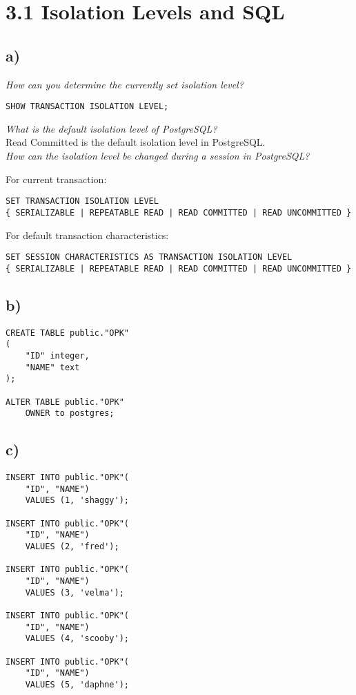 \documentclass[ngerman]{dis-template-add}
\begin{document}
\section*{3.1 Isolation Levels and SQL}

\subsection*{a)}

\textit{How can you determine the currently set isolation level?
}
\begin{verbatim}
SHOW TRANSACTION ISOLATION LEVEL;
\end{verbatim}

\textit{What is the default isolation level of PostgreSQL?
} \\
Read Committed is the default isolation level in PostgreSQL. \\

\textit{How can the isolation level be changed during a session in PostgreSQL?}

For current transaction:
\begin{verbatim}
SET TRANSACTION ISOLATION LEVEL
{ SERIALIZABLE | REPEATABLE READ | READ COMMITTED | READ UNCOMMITTED }
\end{verbatim}

For default transaction characteristics:
\begin{verbatim}
SET SESSION CHARACTERISTICS AS TRANSACTION ISOLATION LEVEL
{ SERIALIZABLE | REPEATABLE READ | READ COMMITTED | READ UNCOMMITTED }
\end{verbatim}


\subsection*{b)}

\begin{verbatim}
CREATE TABLE public."OPK"
(
    "ID" integer,
    "NAME" text
);

ALTER TABLE public."OPK"
    OWNER to postgres;
\end{verbatim}


\subsection*{c)}

\begin{verbatim}
INSERT INTO public."OPK"(
    "ID", "NAME")
    VALUES (1, 'shaggy');

INSERT INTO public."OPK"(
    "ID", "NAME")
    VALUES (2, 'fred');
	
INSERT INTO public."OPK"(
    "ID", "NAME")
    VALUES (3, 'velma');
	
INSERT INTO public."OPK"(
    "ID", "NAME")
    VALUES (4, 'scooby');
	
INSERT INTO public."OPK"(
    "ID", "NAME")
    VALUES (5, 'daphne');
\end{verbatim}
\end{document}

